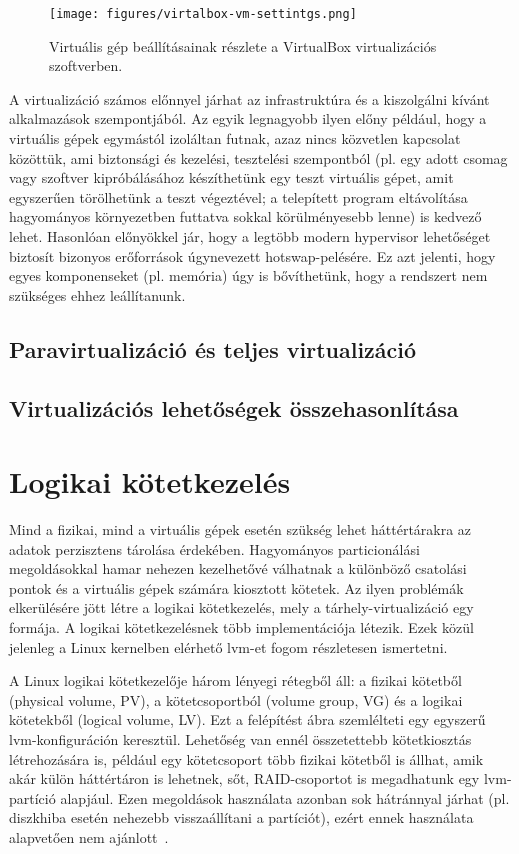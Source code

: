 \begin{figure}[!ht]
	\centering
	\texttt{[image: figures/virtalbox-vm-settintgs.png]}
	\caption{Virtuális gép beállításainak részlete a VirtualBox virtualizációs szoftverben.}
	\label{fig:vboxsettings}
\end{figure}


A virtualizáció számos előnnyel járhat az infrastruktúra és a kiszolgálni kívánt alkalmazások szempontjából. Az egyik legnagyobb ilyen előny például, hogy a virtuális gépek egymástól izoláltan futnak, azaz nincs közvetlen kapcsolat közöttük, ami biztonsági és kezelési, tesztelési szempontból (pl. egy adott csomag vagy szoftver kipróbálásához készíthetünk egy teszt virtuális gépet, amit egyszerűen törölhetünk a teszt végeztével; a telepített program eltávolítása hagyományos környezetben futtatva sokkal körülményesebb lenne) is kedvező lehet. Hasonlóan előnyökkel jár, hogy a legtöbb modern \gls{hypervisor} lehetőséget biztosít bizonyos erőforrások úgynevezett \gls{hotswap}-pelésére. Ez azt jelenti, hogy egyes komponenseket (pl. memória) úgy is bővíthetünk, hogy a rendszert nem szükséges ehhez leállítanunk.

\subsection{Paravirtualizáció és teljes virtualizáció}

\subsection{Virtualizációs lehetőségek összehasonlítása} \label{sect:hypervisor-comparision}

\section{Logikai kötetkezelés}
Mind a fizikai, mind a virtuális gépek esetén szükség lehet háttértárakra az adatok perzisztens tárolása érdekében. Hagyományos particionálási megoldásokkal hamar nehezen kezelhetővé válhatnak a különböző csatolási pontok és a virtuális gépek számára kiosztott kötetek. Az ilyen problémák elkerülésére jött létre a logikai kötetkezelés, mely a tárhely-virtualizáció egy formája. A logikai kötetkezelésnek több implementációja létezik. %
Ezek közül jelenleg a Linux kernelben elérhető \gls{lvm}-et fogom részletesen ismertetni.

A Linux logikai kötetkezelője három lényegi rétegből áll: a fizikai kötetből (physical volume, PV), a kötetcsoportból (volume group, VG) és a logikai kötetekből (logical volume, LV). Ezt a felépítést  ábra szemlélteti egy egyszerű \gls{lvm}-konfiguráción keresztül.
Lehetőség van ennél összetettebb kötetkiosztás létrehozására is, például egy kötetcsoport több fizikai kötetből is állhat, amik akár külön háttértáron is lehetnek, sőt, RAID-csoportot is megadhatunk egy \gls{lvm}-partíció alapjául. Ezen megoldások használata azonban sok hátránnyal járhat (pl. diszkhiba esetén nehezebb visszaállítani a partíciót), ezért ennek használata alapvetően nem ajánlott~\cite{RHLVM}.

